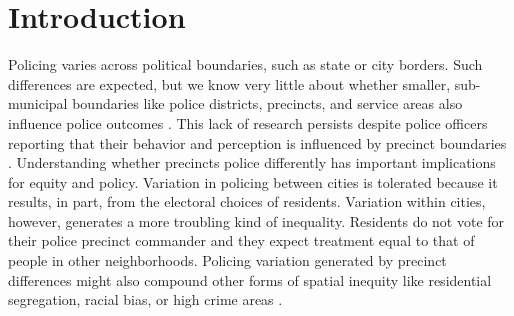 \documentclass[a4paper,11pt]{article}
\begin{document}
\begin{abstract}
\end{abstract}

\section{Introduction}

Policing varies across political boundaries, such as state or city borders. Such differences are expected, but we know very little about whether smaller, sub-municipal boundaries like police districts, precincts, and service areas also influence police outcomes \citep{klinger1997negotiating}. This lack of research persists despite police officers reporting that their behavior and perception is influenced by precinct boundaries \citep{hassell2007variation}. Understanding whether precincts police differently has important implications for equity and policy. Variation in policing between cities is tolerated because it results, in part, from the electoral choices of residents. Variation within cities, however, generates a more troubling kind of inequality. Residents do not vote for their police precinct commander and they expect treatment equal to that of people in other neighborhoods. Policing variation generated by precinct differences might also compound other forms of spatial inequity like residential segregation, racial bias, or high crime areas \citep{bell2020anti}. 
\end{document}
